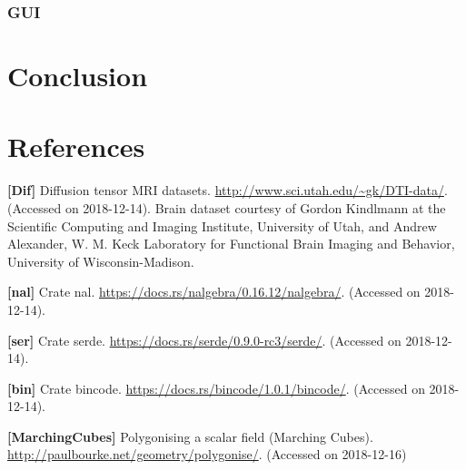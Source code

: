 \documentclass{article}
\begin{document}
\subsubsection{GUI}


\section*{Conclusion}


\section*{References}

\textbf{[Dif]}
\label{ref:Dif}
Diffusion tensor MRI datasets. \url{http://www.sci.utah.edu/~gk/DTI-data/}. (Accessed on 2018-12-14). Brain dataset courtesy of Gordon Kindlmann at the Scientific Computing and Imaging Institute, University of Utah, and Andrew Alexander, W. M. Keck Laboratory for Functional Brain Imaging and Behavior, University of Wisconsin-Madison.

\textbf{[nal]}
\label{ref:nal}
Crate nal. \url{https://docs.rs/nalgebra/0.16.12/nalgebra/}. (Accessed on 2018-12-14).

\textbf{[ser]}
\label{ref:ser}
Crate serde. \url{https://docs.rs/serde/0.9.0-rc3/serde/}. (Accessed on 2018-12-14).

\textbf{[bin]}
\label{ref:bin}
Crate bincode. \url{https://docs.rs/bincode/1.0.1/bincode/}. (Accessed on 2018-12-14).

\textbf{[MarchingCubes]}
\label{ref:MarchingCubes}
Polygonising a scalar field (Marching Cubes). \url{http://paulbourke.net/geometry/polygonise/}. (Accessed on 2018-12-16)
\end{document}
